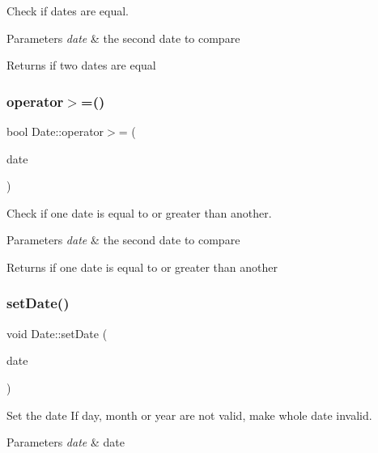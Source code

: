 Check if dates are equal. 
\begin{DoxyParams}{Parameters}
{\em date} & the second date to compare \\
\hline
\end{DoxyParams}
\begin{DoxyReturn}{Returns}
if two dates are equal 
\end{DoxyReturn}
\hypertarget{classDate_a4a291faa73653c0a14981db2dee21678}{}\label{classDate_a4a291faa73653c0a14981db2dee21678} 
\subsubsection{\texorpdfstring{operator$>$=()}{operator>=()}}
{\footnotesize\ttfamily bool Date\+::operator$>$= (\begin{DoxyParamCaption}\item[{const \hyperlink{classDate}{Date} \&}]{date }\end{DoxyParamCaption})}

Check if one date is equal to or greater than another. 
\begin{DoxyParams}{Parameters}
{\em date} & the second date to compare \\
\hline
\end{DoxyParams}
\begin{DoxyReturn}{Returns}
if one date is equal to or greater than another 
\end{DoxyReturn}
\hypertarget{classDate_abbd3c22e63d9fb3fbb1a34e5614aab22}{}\label{classDate_abbd3c22e63d9fb3fbb1a34e5614aab22} 
\subsubsection{\texorpdfstring{set\+Date()}{setDate()}}
{\footnotesize\ttfamily void Date\+::set\+Date (\begin{DoxyParamCaption}\item[{string}]{date }\end{DoxyParamCaption})}

Set the date If day, month or year are not valid, make whole date invalid. 
\begin{DoxyParams}{Parameters}
{\em date} & date \\
\hline
\end{DoxyParams}
\hypertarget{classDate_a18dc2bd52ab8adcca331f66c27ed6623}{}\label{classDate_a18dc2bd52ab8adcca331f66c27ed6623} 
